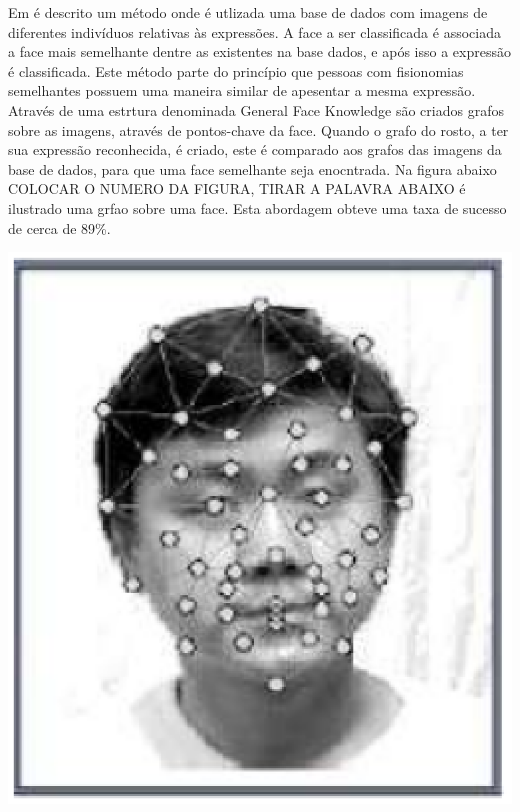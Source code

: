 Em  é descrito um método onde é utlizada uma base de dados com imagens de diferentes indivíduos relativas às expressões. A face a ser classificada é associada a face mais semelhante dentre as existentes na base dados, e após isso a expressão é classificada. Este método parte do princípio que pessoas com fisionomias semelhantes possuem uma maneira similar de apesentar a mesma expressão. Através de uma estrtura denominada General Face Knowledge são criados grafos sobre as imagens, através de pontos-chave da face. Quando o grafo do rosto, a ter sua expressão reconhecida, é criado, este é comparado aos grafos das imagens da base de dados, para que uma face semelhante seja enocntrada. Na figura abaixo COLOCAR O NUMERO DA FIGURA, TIRAR A PALAVRA ABAIXO é ilustrado uma grfao sobre uma face. Esta abordagem obteve uma taxa de sucesso de cerca de 89\%.
\begin{center}
	\includegraphics[scale=0.5]{graficos/metodo1_classi}
\end{center}

